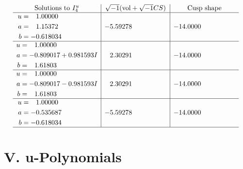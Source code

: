 \documentclass[1p]{elsarticle_modified}
\theoremstyle{definition}
\newcommand{\I}{\sqrt{-1}}
\begin{document}
$$\begin{array}{c|c|c}  
\text{Solutions to }I^u_{4}& \I (\text{vol} + \sqrt{-1}CS) & \text{Cusp shape}\\
 \hline 
\begin{aligned}
u &= \phantom{-}1.00000\phantom{ +0.000000I} \\
a &= \phantom{-}1.15372\phantom{ +0.000000I} \\
b &= -0.618034\phantom{ +0.000000I}\end{aligned}
 & -5.59278\phantom{ +0.000000I} & -14.0000\phantom{ +0.000000I} \\ \hline\begin{aligned}
u &= \phantom{-}1.00000\phantom{ +0.000000I} \\
a &= -0.809017 + 0.981593 I \\
b &= \phantom{-}1.61803\phantom{ +0.000000I}\end{aligned}
 & \phantom{-}2.30291\phantom{ +0.000000I} & -14.0000\phantom{ +0.000000I} \\ \hline\begin{aligned}
u &= \phantom{-}1.00000\phantom{ +0.000000I} \\
a &= -0.809017 - 0.981593 I \\
b &= \phantom{-}1.61803\phantom{ +0.000000I}\end{aligned}
 & \phantom{-}2.30291\phantom{ +0.000000I} & -14.0000\phantom{ +0.000000I} \\ \hline\begin{aligned}
u &= \phantom{-}1.00000\phantom{ +0.000000I} \\
a &= -0.535687\phantom{ +0.000000I} \\
b &= -0.618034\phantom{ +0.000000I}\end{aligned}
 & -5.59278\phantom{ +0.000000I} & -14.0000\phantom{ +0.000000I}\\
 \hline 
 \end{array}$$\newpage
\newpage\renewcommand{\arraystretch}{1}
\centering \section*{ V. u-Polynomials}
\end{document}
